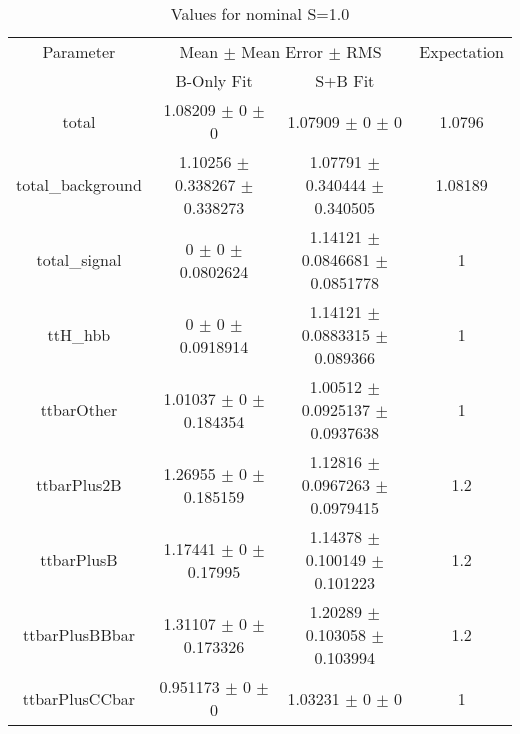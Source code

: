 \begin{table}
\centering
\caption{Values for nominal S=1.0}
\begin{tabular}{cccc}
\toprule
Parameter & \multicolumn{2}{c}{Mean $\pm$ Mean Error $\pm$ RMS} & Expectation\\
 & B-Only Fit & S+B Fit & \\
\midrule
total & \num{1.08209} $\pm$ \num{0} $\pm$ \num{0} & \num{1.07909} $\pm$ \num{0} $\pm$ \num{0} & \num{1.0796}\\
total\_background & \num{1.10256} $\pm$ \num{0.338267} $\pm$ \num{0.338273} & \num{1.07791} $\pm$ \num{0.340444} $\pm$ \num{0.340505} & \num{1.08189}\\
total\_signal & \num{0} $\pm$ \num{0} $\pm$ \num{0.0802624} & \num{1.14121} $\pm$ \num{0.0846681} $\pm$ \num{0.0851778} & \num{1}\\
ttH\_hbb & \num{0} $\pm$ \num{0} $\pm$ \num{0.0918914} & \num{1.14121} $\pm$ \num{0.0883315} $\pm$ \num{0.089366} & \num{1}\\
ttbarOther & \num{1.01037} $\pm$ \num{0} $\pm$ \num{0.184354} & \num{1.00512} $\pm$ \num{0.0925137} $\pm$ \num{0.0937638} & \num{1}\\
ttbarPlus2B & \num{1.26955} $\pm$ \num{0} $\pm$ \num{0.185159} & \num{1.12816} $\pm$ \num{0.0967263} $\pm$ \num{0.0979415} & \num{1.2}\\
ttbarPlusB & \num{1.17441} $\pm$ \num{0} $\pm$ \num{0.17995} & \num{1.14378} $\pm$ \num{0.100149} $\pm$ \num{0.101223} & \num{1.2}\\
ttbarPlusBBbar & \num{1.31107} $\pm$ \num{0} $\pm$ \num{0.173326} & \num{1.20289} $\pm$ \num{0.103058} $\pm$ \num{0.103994} & \num{1.2}\\
ttbarPlusCCbar & \num{0.951173} $\pm$ \num{0} $\pm$ \num{0} & \num{1.03231} $\pm$ \num{0} $\pm$ \num{0} & \num{1}\\
\bottomrule
\end{tabular}
\end{table}